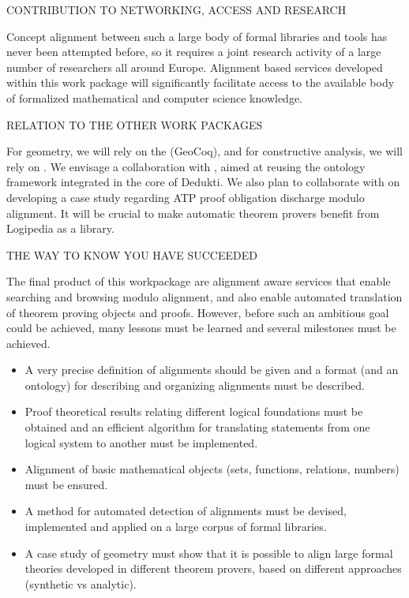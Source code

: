 {\color{red} CONTRIBUTION TO NETWORKING, ACCESS AND RESEARCH}

Concept alignment between such a large body of formal libraries and
tools has never been attempted before, so it requires a joint research
activity of a large number of researchers all around Europe. Alignment
based services developed within this work package will significantly
facilitate access to the available body of formalized mathematical and
computer science knowledge.

{\color{red} RELATION TO THE OTHER WORK PACKAGES}

For geometry, we will rely on the 
(GeoCoq), and for constructive analysis, we will rely on
. We envisage a collaboration with
, aimed at reusing the ontology framework
integrated in the core of Dedukti. We also plan to collaborate with
 on developing a case study regarding ATP proof
obligation discharge modulo alignment. It will be crucial to make
automatic theorem provers benefit from Logipedia as a library.

{\color{red} THE WAY TO KNOW YOU HAVE SUCCEEDED }

The final product of this workpackage are alignment aware services
that enable searching and browsing modulo alignment, and also enable
automated translation of theorem proving objects and proofs. However,
before such an ambitious goal could be achieved, many lessons must be
learned and several milestones must be achieved.
\begin{itemize}
\item A very precise definition of alignments should be given and a
  format (and an ontology) for describing and organizing alignments
  must be described.
\item Proof theoretical results relating different logical foundations
  must be obtained and an efficient algorithm for translating
  statements from one logical system to another must be implemented.
\item Alignment of basic mathematical objects (sets, functions,
  relations, numbers) must be ensured.
\item A method for automated detection of alignments must be devised,
  implemented and applied on a large corpus of formal libraries.
\item A case study of geometry must show that it is possible to align
  large formal theories developed in different theorem provers, based
  on different approaches (synthetic vs analytic).
\end{itemize}

